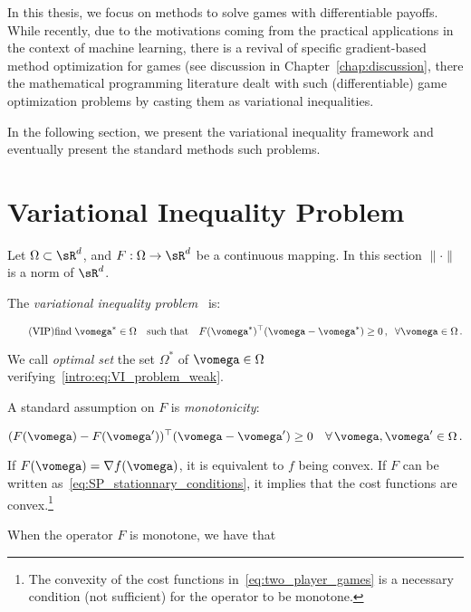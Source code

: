 In this thesis, we focus on methods to solve games with differentiable payoffs. While recently, due to the motivations coming from the practical applications in the context of machine learning, there is a revival of specific gradient-based method optimization for games (see discussion in Chapter~\ref{chap:discussion}, there the mathematical programming literature dealt with such (differentiable) game optimization problems by casting them as variational inequalities. 




In the following section, we present the variational inequality framework and eventually present the standard methods such problems.




\section{Variational Inequality Problem}




Let $\Omega \subset \sR^d$, and $F : \Omega \to \sR^d$ be a continuous mapping. In this section $\|\cdot\|$ is a norm of $\sR^d$. 

The \emph{variational inequality problem}~\citep{harker1990finite} is:

\begin{equation}\label{intro:eq:VI_problem_weak} \tag{VIP}
\text{find} \; \vomega^* \in \Omega \quad \text{such that} \quad F(\vomega^*)^\top (\vomega - \vomega^*) \geq 0 \, , \; \;\forall \vomega \in \Omega\,.
\end{equation}

We call \emph{optimal set} the set $\Omega^*$ of $\vomega \in \Omega$ verifying~\eqref{intro:eq:VI_problem_weak}.

A standard assumption on $F$ is \emph{monotonicity}: 

\begin{equation} 
(F(\vomega) - F(\vomega'))^\top (\vomega - \vomega') \geq 0 \quad \forall\, \vomega,\vomega' \in \Omega \,.
\end{equation} 

If $F(\vomega) = \nabla f(\vomega)$, it is equivalent to $f$ being convex. If $F$ can be written as~\eqref{eq:SP_stationnary_conditions}, it implies that the cost functions are convex.\footnote{The convexity of the cost functions in~\eqref{eq:two_player_games} is a necessary condition (not sufficient) for the operator to be monotone.}

When the operator $F$ is monotone, we have that 

